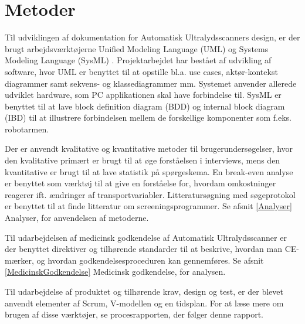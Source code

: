 \chapter{Metoder}\label{Metoder}

Til udviklingen af dokumentation for Automatisk Ultralydsscanners design, er der brugt arbejdsværktøjerne Unified Modeling Language (UML) \cite{UML}  og Systems Modeling Language (SysML) \cite{SysML}. Projektarbejdet har bestået af udvikling af software, hvor UML er benyttet til at opstille bl.a. use cases, aktør-kontekst diagrammer samt sekvens- og klassediagrammer mm. Systemet anvender allerede udviklet hardware, som PC applikationen skal have forbindelse til. SysML er benyttet til at lave block definition diagram (BDD) og internal block diagram (IBD) til at illustrere forbindelsen mellem de forskellige komponenter som f.eks. robotarmen.

Der er anvendt kvalitative og kvantitative metoder \cite {MetoderBruger} til brugerundersøgelser, hvor den kvalitative primært er brugt til at øge forståelsen i interviews, mens den kvantitative er brugt til at lave statistik på spørgeskema. En break-even analyse \cite{Erhvervsokonomi} er benyttet som værktøj til at give en forståelse for, hvordam omkostninger reagerer ift. ændringer af transportvariabler. Litteratursøgning med søgeprotokol er benyttet til at finde litteratur om screeningsprogrammer. Se afsnit \ref{Analyser} Analyser, for anvendelsen af metoderne. 

Til udarbejdelsen af medicinsk godkendelse af Automatisk Ultralydsscanner er der benyttet direktiver og tilhørende standarder til at beskrive, hvordan man CE-mærker, og hvordan godkendelsesproceduren kan gennemføres.  Se afsnit \ref{MedicinskGodkendelse} Medicinsk godkendelse, for analysen. 

Til udarbejdelse af produktet og tilhørende krav, design og test, er der blevet anvendt elementer af Scrum, V-modellen og en tidsplan. For at læse mere om brugen af disse værktøjer, se procesrapporten, der følger denne rapport.

